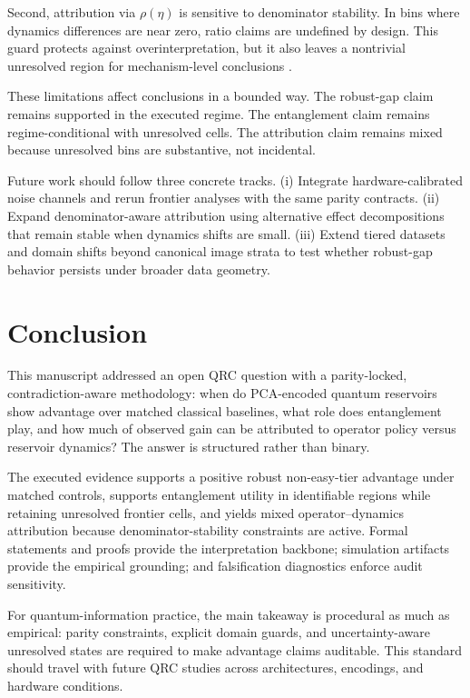 \documentclass{article} %
\begin{document}
Second, attribution via $\rho(\eta)$ is sensitive to denominator stability. In bins where dynamics differences are near zero, ratio claims are undefined by design. This guard protects against overinterpretation, but it also leaves a nontrivial unresolved region for mechanism-level conclusions \citep{arxiv_2602_14677,arxiv_2509_06873,arxiv_2601_23084}.

These limitations affect conclusions in a bounded way. The robust-gap claim remains supported in the executed regime. The entanglement claim remains regime-conditional with unresolved cells. The attribution claim remains mixed because unresolved bins are substantive, not incidental.

Future work should follow three concrete tracks. (i) Integrate hardware-calibrated noise channels and rerun frontier analyses with the same parity contracts. (ii) Expand denominator-aware attribution using alternative effect decompositions that remain stable when dynamics shifts are small. (iii) Extend tiered datasets and domain shifts beyond canonical image strata to test whether robust-gap behavior persists under broader data geometry.

\section{Conclusion}
\label{sec:conclusion}
This manuscript addressed an open QRC question with a parity-locked, contradiction-aware methodology: when do PCA-encoded quantum reservoirs show advantage over matched classical baselines, what role does entanglement play, and how much of observed gain can be attributed to operator policy versus reservoir dynamics? The answer is structured rather than binary.

The executed evidence supports a positive robust non-easy-tier advantage under matched controls, supports entanglement utility in identifiable regions while retaining unresolved frontier cells, and yields mixed operator--dynamics attribution because denominator-stability constraints are active. Formal statements and proofs provide the interpretation backbone; simulation artifacts provide the empirical grounding; and falsification diagnostics enforce audit sensitivity.

For quantum-information practice, the main takeaway is procedural as much as empirical: parity constraints, explicit domain guards, and uncertainty-aware unresolved states are required to make advantage claims auditable. This standard should travel with future QRC studies across architectures, encodings, and hardware conditions.
\end{document}
